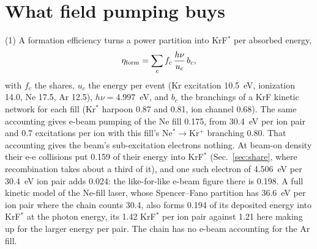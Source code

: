 \documentclass[11pt]{article}
\numberwithin{equation}{section}
\begin{document}
\section{What field pumping buys}
\label{sec:wallplug}

{\noindent}(1) A formation efficiency turns a
power partition into KrF$^*$ per absorbed energy,
\begin{equation}
\eta_{\rm form}=\sum_cf_c\,\frac{h\nu}{u_c}\,b_c,
\label{eq:etaform}
\end{equation}
with $f_c$ the shares, $u_c$ the energy per event (Kr excitation 10.5~eV, ionization
14.0, Ne 17.5, Ar 12.5), $h\nu=4.997$~eV, and $b_c$ the branchings of a KrF kinetic
network for each fill (Kr$^*$ harpoon 0.87 and 0.81, ion channel 0.68). The same
accounting gives e-beam pumping of the Ne fill 0.175, from 30.4~eV per ion pair and 0.7
excitations per ion with this fill's Ne$^*\to$Kr$^+$ branching 0.80. That accounting
gives the beam's sub-excitation electrons
nothing. At beam-on density their e-e collisions put 0.159 of their energy into
KrF$^*$ (Sec.~\ref{sec:share}, where recombination takes about a third of it), and one
such electron of 4.506~eV per 30.4~eV ion pair adds 0.024: the like-for-like e-beam
figure there is 0.198. A full kinetic model of the Ne-fill laser, whose Spencer--Fano
partition has 36.6~eV per ion pair where the chain counts 30.4, also forms 0.194 of its
deposited energy into KrF$^*$ at the photon energy, its 1.42 KrF$^*$ per ion pair
against 1.21 here making up for the larger energy per pair. The chain has no e-beam
accounting for the Ar fill.
\end{document}
